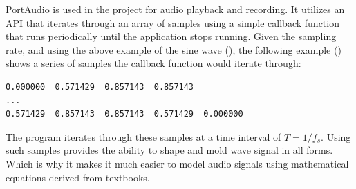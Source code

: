 

PortAudio is used in the project for audio playback and recording. It utilizes an API that iterates through an array of samples
using a simple callback function that runs periodically until the application stops running. Given the sampling rate, and using the above
example of the sine wave (), the following example () \cite{anthropicclaude} 
shows a series of samples the callback function would iterate through: 

\begin{verbatim}
0.000000  0.571429  0.857143  0.857143
...
0.571429  0.857143  0.857143  0.571429  0.000000
\end{verbatim}

The program iterates through these samples at a time interval of $T = 1/f_s$. Using such samples provides the ability
to shape and mold wave signal in all forms. Which is why it makes it much easier to model audio signals using mathematical
equations derived from textbooks.













